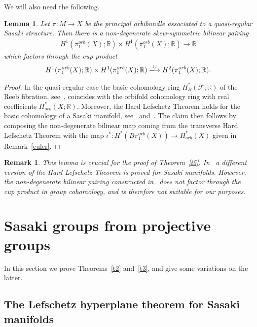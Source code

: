 \documentclass[12pt,leqno]{amsart}
\newcommand{\lra}{\longrightarrow}
\newcommand{\R}{\mathbb{R}}
\newcommand{\F}{\mathcal{F}}
\newtheorem{lem}[theor]{Lemma}
\newtheorem{remark}[theor]{Remark}
\begin{document}
We will also need the following.
\begin{lem}\label{LemNonDegPairingOrbi}
	Let $\pi\colon M\lra X $ be the principal orbibundle associated to a quasi-regular Sasaki structure.
	Then there is a non-degenerate skew-symmetric bilinear pairing
	\begin{align}\label{EqNonDegPairingOrbi}
		H^1(\pi_1^{orb}(X );\R)\times H^1(\pi_1^{orb}(X );\R)\lra\R
	\end{align}
	which factors through the cup product
	\begin{align*}
		H^1(\pi_1^{orb}(X );\R)\times H^1(\pi_1^{orb}(X );\R)\xlongrightarrow{\cup} H^2(\pi_1^{orb}(X );\R).
	\end{align*}
\end{lem}
\begin{proof}
	In the quasi-regular case the basic cohomology ring $H_B^*(\F;\R)$ of the Reeb fibration, see~\cite[Section~7.2]{Boyer}, 
	coincides with the orbifold cohomology ring with real coefficients $H_{orb}^*(X ;\R)$.
	Moreover, the Hard Lefschetz Theorem holds for the basic cohomology of a Sasaki manifold, 
	see~\cite{elkacimialaoui90} and~\cite[Theorem~7.2.9]{Boyer}.
	The claim then follows by composing the non-degenerate bilinear map coming from the transverse Hard Lefschetz Theorem 
	with the map $\iota^*\colon H^*(B\pi_1^{orb}(X))\lra H^*_{orb}(X)$ given in Remark~\ref{euler}.
\end{proof}
\begin{remark}
This lemma is crucial for the proof of Theorem~\ref{t5}.
	In~\cite{cappellettimontanodenicolayudin15} a different version of the Hard Lefschetz Theorem is proved for Sasaki 
	manifolds. However, the non-degenerate bilinear pairing constructed in~\cite{cappellettimontanodenicolayudin15}  
	does not factor through the cup product in group cohomology, and is therefore not suitable for our purposes.
	
\end{remark}


\section{Sasaki groups from projective groups}\label{s:Sasakiprojective}

In this section we  prove Theorems~\ref{t2} and~\ref{t3}, and give some variations on the latter.

\subsection{The Lefschetz hyperplane theorem for Sasaki manifolds}
\end{document}
